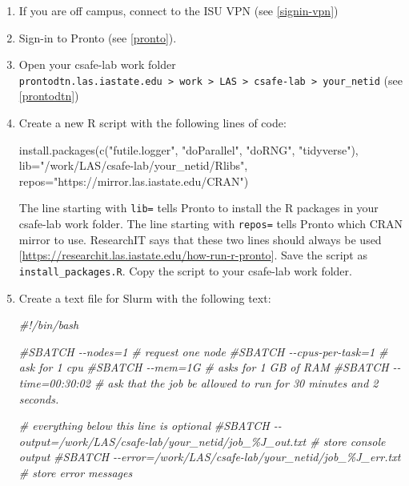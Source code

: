 \documentclass[
]{book}
\newenvironment{Shaded}{\begin{snugshade}}{\end{snugshade}}
\newcommand{\AttributeTok}[1]{\textcolor[rgb]{0.77,0.63,0.00}{#1}}
\newcommand{\CommentTok}[1]{\textcolor[rgb]{0.56,0.35,0.01}{\textit{#1}}}
\newcommand{\FunctionTok}[1]{\textcolor[rgb]{0.00,0.00,0.00}{#1}}
\newcommand{\NormalTok}[1]{#1}
\newcommand{\StringTok}[1]{\textcolor[rgb]{0.31,0.60,0.02}{#1}}
\begin{document}
\begin{enumerate}
\def\labelenumi{\arabic{enumi}.}
\item
  If you are off campus, connect to the ISU VPN (see \ref{signin-vpn})
\item
  Sign-in to Pronto (see \ref{pronto}).
\item
  Open your csafe-lab work folder \texttt{prontodtn.las.iastate.edu\ \textgreater{}\ work\ \textgreater{}\ LAS\ \textgreater{}\ csafe-lab\ \textgreater{}\ your\_netid} (see \ref{prontodtn})
\item
  Create a new R script with the following lines of code:

\begin{Shaded}
\begin{Highlighting}[]
\FunctionTok{install.packages}\NormalTok{(}\FunctionTok{c}\NormalTok{(}\StringTok{"futile.logger"}\NormalTok{, }
                   \StringTok{"doParallel"}\NormalTok{, }
                   \StringTok{"doRNG"}\NormalTok{,}
                   \StringTok{"tidyverse"}\NormalTok{), }
                   \AttributeTok{lib=}\StringTok{"/work/LAS/csafe{-}lab/your\_netid/Rlibs"}\NormalTok{, }
                   \AttributeTok{repos=}\StringTok{"https://mirror.las.iastate.edu/CRAN"}\NormalTok{)}
\end{Highlighting}
\end{Shaded}

  The line starting with \texttt{lib=} tells Pronto to install the R packages in your csafe-lab work folder. The line starting with \texttt{repos=} tells Pronto which CRAN mirror to use. ResearchIT says that these two lines should always be used {[}\url{https://researchit.las.iastate.edu/how-run-r-pronto}{]}. Save the script as \texttt{install\_packages.R}. Copy the script to your csafe-lab work folder.
\item
  Create a text file for Slurm with the following text:

\begin{Shaded}
\begin{Highlighting}[]
\CommentTok{\#!/bin/bash}

\CommentTok{\#SBATCH {-}{-}nodes=1 \# request one node}
\CommentTok{\#SBATCH {-}{-}cpus{-}per{-}task=1  \# ask for 1 cpu}
\CommentTok{\#SBATCH {-}{-}mem=1G \#  asks for 1 GB of RAM}
\CommentTok{\#SBATCH {-}{-}time=00:30:02 \# ask that the job be allowed to run for 30 minutes and 2 seconds.}

\CommentTok{\# everything below this line is optional}
\CommentTok{\#SBATCH {-}{-}output=/work/LAS/csafe{-}lab/your\_netid/job\_\%J\_out.txt \# store console output}
\CommentTok{\#SBATCH {-}{-}error=/work/LAS/csafe{-}lab/your\_netid/job\_\%J\_err.txt \# store error messages}


\end{Highlighting}
\end{Shaded}
\end{enumerate}
\end{document}
